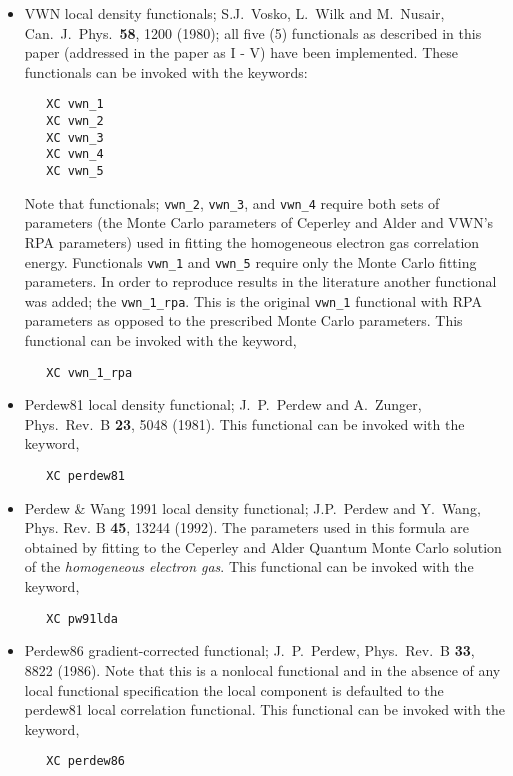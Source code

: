 \begin{itemize}
\item VWN local density functionals; S.J.~Vosko, L.~Wilk and M.~Nusair, 
  Can.~J.~Phys.~{\bf  58}, 1200 (1980); all five (5) functionals as
  described in this paper (addressed in the paper as I - V) have been
  implemented.  These functionals can be invoked with the keywords:
\begin{verbatim}
   XC vwn_1
   XC vwn_2
   XC vwn_3
   XC vwn_4
   XC vwn_5
\end{verbatim}

  Note that functionals; \verb+vwn_2+, \verb+vwn_3+, and \verb+vwn_4+
  require both sets of parameters (the Monte Carlo parameters of
  Ceperley and Alder and VWN's RPA parameters) used in fitting the
  homogeneous electron gas correlation energy.  Functionals
  \verb+vwn_1+ and \verb+vwn_5+ require only the Monte Carlo fitting
  parameters.  In order to reproduce results in the literature another
  functional was added; the \verb+vwn_1_rpa+.  This is the original
  \verb+vwn_1+ functional with RPA parameters as opposed to the
  prescribed Monte Carlo parameters.  This functional can be invoked
  with the keyword,
\begin{verbatim}
   XC vwn_1_rpa
\end{verbatim}

\item Perdew81 local density functional; J.~P.~Perdew and A.~Zunger,
  Phys.~Rev.~B {\bf23}, 5048 (1981). This functional can be invoked with the
  keyword,
\begin{verbatim}
   XC perdew81
\end{verbatim}

\item Perdew \& Wang 1991 local density functional;  J.P.~Perdew
  and Y.~Wang, Phys. Rev. B {\bf 45}, 13244 (1992).  The parameters
  used in this formula are obtained by fitting to the Ceperley and
  Alder Quantum Monte Carlo solution of the {\em
  homogeneous electron gas}.  This functional can be invoked with the
  keyword,
\begin{verbatim}
   XC pw91lda
\end{verbatim}

\item Perdew86 gradient-corrected functional; J.~P.~Perdew, Phys.~Rev.~B 
  {\bf33}, 8822 (1986).  Note that this is a nonlocal functional and
  in the absence of any local functional specification the local
  component is defaulted to the perdew81 local correlation
  functional. This functional can be invoked with the
  keyword,
\begin{verbatim}
   XC perdew86
\end{verbatim}


\end{itemize}
